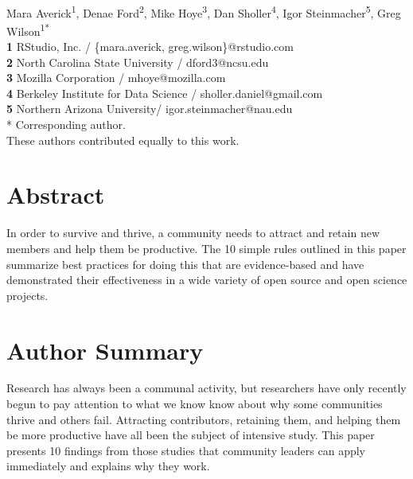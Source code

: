 \documentclass[10pt,letterpaper]{article}
\begin{document}
\vspace*{0.2in}

\begin{flushleft}
{\Large
\textbf{}
}
\newline
\\
{Mara Averick}\textsuperscript{1{\ddag}},
{Denae Ford}\textsuperscript{2{\ddag}},
{Mike Hoye}\textsuperscript{3{\ddag}},
{Dan Sholler}\textsuperscript{4{\ddag}},
{Igor Steinmacher}\textsuperscript{5{\ddag}},
{Greg Wilson}\textsuperscript{1{\ddag}*}
\\
\bigskip
\textbf{1} RStudio, Inc. / \{mara.averick, greg.wilson\}@rstudio.com \\
\textbf{2} North Carolina State University / dford3@ncsu.edu \\
\textbf{3} Mozilla Corporation / mhoye@mozilla.com \\
\textbf{4} Berkeley Institute for Data Science / sholler.daniel@gmail.com \\
\textbf{5} Northern Arizona University/ igor.steinmacher@nau.edu \\\bigskip
* Corresponding author. \\
\bigskip
{\ddag} These authors contributed equally to this work.
\end{flushleft}

\section*{Abstract}

In order to survive and thrive,
a community needs to attract and retain new members
and help them be productive.
The 10 simple rules outlined in this paper
summarize best practices for doing this
that are evidence-based and have demonstrated their effectiveness
in a wide variety of open source and open science projects.

\section*{Author Summary}

Research has always been a communal activity,
but researchers have only recently begun to pay attention to
what we know know about why some communities thrive and others fail.
Attracting contributors,
retaining them,
and helping them be more productive
have all been the subject of intensive study.
This paper presents 10 findings from those studies that community leaders can apply immediately
and explains why they work.
\end{document}
